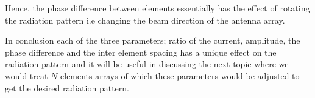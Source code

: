 Hence, the phase difference between elements essentially has the effect of rotating the radiation pattern i.e changing the beam direction of the antenna array.

In conclusion each of the three parameters; ratio of the  current, amplitude, the phase difference and the inter element spacing has a unique effect on the radiation pattern and it will be useful in discussing the next topic where we would treat $ N $ elements arrays of which these parameters would be adjusted to get the desired radiation pattern.